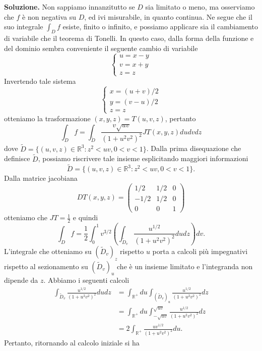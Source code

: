 \begin{enumerate}
	\textbf{Soluzione.}
		Non sappiamo innanzitutto se $D$ sia limitato o meno, ma osserviamo che $f$ è non negativa su $D$, ed ivi misurabile, in quanto continua. Ne segue che il suo integrale $\int_D f$ esiste, finito o infinito, e possiamo applicare sia il cambiamento di variabile che il teorema di Tonelli. In questo caso, dalla forma della funzione e del dominio sembra conveniente il seguente cambio di variabile
		\[
		\begin{cases}
			u = x - y \\
			v = x + y \\
			z = z
		\end{cases}
		\]
		Invertendo tale sistema
		\[
		\begin{cases}
			x = (u + v)/2 \\
			y = (v - u)/2 \\
			z = z
		\end{cases}
		\]
		otteniamo la trasformazione $(x,y,z) = T(u,v,z)$, pertanto
		\[
		\int_D f = \int_{\tilde{D}} \frac{v \sqrt{uv}}{(1 + u^2 v^2)^2} J T(x,y,z) du dv dz
		\]
		dove $\tilde{D} = \{(u,v,z) \in \mathbb{R}^3 : z^2 < uv, 0 < v < 1\}$. Dalla prima disequazione che definisce $\tilde{D}$, possiamo riscrivere tale insieme esplicitando maggiori informazioni
		\[
		\tilde{D} = \{(u,v,z) \in \mathbb{R}^3 : z^2 < uv, 0 < v < 1\}.
		\]
		Dalla matrice jacobiana
		\[
		D T(x,y,z) = \begin{pmatrix}
			1/2 & 1/2 & 0 \\
			-1/2 & 1/2 & 0 \\
			0 & 0 & 1
		\end{pmatrix}
		\]
		otteniamo che $JT = \frac{1}{2}$ e quindi
		\[
		\int_D f = \frac{1}{2} \int_0^1 v^{3/2} \left(\int_{\tilde{D}_v} \frac{u^{1/2}}{(1 + u^2 v^2)^2} du dz\right) dv.
		\]
		L'integrale che otteniamo su $(\tilde{D}_v)_z$ rispetto $u$ porta a calcoli più impegnativi rispetto al sezionamento su $(\tilde{D}_v)_u$ che è un insieme limitato e l'integranda non dipende da $z$. Abbiamo i seguenti calcoli
		\[
		\begin{aligned}
			\int_{\tilde{D}_v} \frac{u^{1/2}}{(1 + u^2 v^2)^2} du dz &= \int_{\mathbb{R}^+} du \int_{(\tilde{D}_v)_u} \frac{u^{1/2}}{(1 + u^2 v^2)^2} dz \\
			&= \int_{\mathbb{R}^+} du \int_{-\sqrt{uv}}^{\sqrt{uv}} \frac{u^{1/2}}{(1 + u^2 v^2)^2} dz \\
			&= 2 \int_{\mathbb{R}^+} \frac{u v^{1/2}}{(1 + u^2 v^2)^2} du.
		\end{aligned}
		\]
		Pertanto, ritornando al calcolo iniziale si ha

\end{enumerate}
